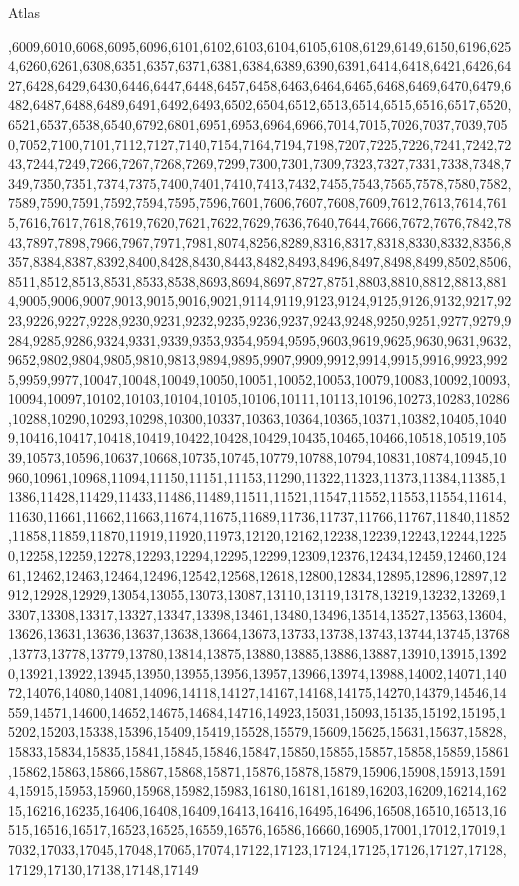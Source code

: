 \begin{lexlean}{Atlas}
\begin{coremodule}
,6009,6010,6068,6095,6096,6101,6102,6103,6104,6105,6108,6129,6149,6150,6196,6254,6260,6261,6308,6351,6357,6371,6381,6384,6389,6390,6391,6414,6418,6421,6426,6427,6428,6429,6430,6446,6447,6448,6457,6458,6463,6464,6465,6468,6469,6470,6479,6482,6487,6488,6489,6491,6492,6493,6502,6504,6512,6513,6514,6515,6516,6517,6520,6521,6537,6538,6540,6792,6801,6951,6953,6964,6966,7014,7015,7026,7037,7039,7050,7052,7100,7101,7112,7127,7140,7154,7164,7194,7198,7207,7225,7226,7241,7242,7243,7244,7249,7266,7267,7268,7269,7299,7300,7301,7309,7323,7327,7331,7338,7348,7349,7350,7351,7374,7375,7400,7401,7410,7413,7432,7455,7543,7565,7578,7580,7582,7589,7590,7591,7592,7594,7595,7596,7601,7606,7607,7608,7609,7612,7613,7614,7615,7616,7617,7618,7619,7620,7621,7622,7629,7636,7640,7644,7666,7672,7676,7842,7843,7897,7898,7966,7967,7971,7981,8074,8256,8289,8316,8317,8318,8330,8332,8356,8357,8384,8387,8392,8400,8428,8430,8443,8482,8493,8496,8497,8498,8499,8502,8506,8511,8512,8513,8531,8533,8538,8693,8694,8697,8727,8751,8803,8810,8812,8813,8814,9005,9006,9007,9013,9015,9016,9021,9114,9119,9123,9124,9125,9126,9132,9217,9223,9226,9227,9228,9230,9231,9232,9235,9236,9237,9243,9248,9250,9251,9277,9279,9284,9285,9286,9324,9331,9339,9353,9354,9594,9595,9603,9619,9625,9630,9631,9632,9652,9802,9804,9805,9810,9813,9894,9895,9907,9909,9912,9914,9915,9916,9923,9925,9959,9977,10047,10048,10049,10050,10051,10052,10053,10079,10083,10092,10093,10094,10097,10102,10103,10104,10105,10106,10111,10113,10196,10273,10283,10286,10288,10290,10293,10298,10300,10337,10363,10364,10365,10371,10382,10405,10409,10416,10417,10418,10419,10422,10428,10429,10435,10465,10466,10518,10519,10539,10573,10596,10637,10668,10735,10745,10779,10788,10794,10831,10874,10945,10960,10961,10968,11094,11150,11151,11153,11290,11322,11323,11373,11384,11385,11386,11428,11429,11433,11486,11489,11511,11521,11547,11552,11553,11554,11614,11630,11661,11662,11663,11674,11675,11689,11736,11737,11766,11767,11840,11852,11858,11859,11870,11919,11920,11973,12120,12162,12238,12239,12243,12244,12250,12258,12259,12278,12293,12294,12295,12299,12309,12376,12434,12459,12460,12461,12462,12463,12464,12496,12542,12568,12618,12800,12834,12895,12896,12897,12912,12928,12929,13054,13055,13073,13087,13110,13119,13178,13219,13232,13269,13307,13308,13317,13327,13347,13398,13461,13480,13496,13514,13527,13563,13604,13626,13631,13636,13637,13638,13664,13673,13733,13738,13743,13744,13745,13768,13773,13778,13779,13780,13814,13875,13880,13885,13886,13887,13910,13915,13920,13921,13922,13945,13950,13955,13956,13957,13966,13974,13988,14002,14071,14072,14076,14080,14081,14096,14118,14127,14167,14168,14175,14270,14379,14546,14559,14571,14600,14652,14675,14684,14716,14923,15031,15093,15135,15192,15195,15202,15203,15338,15396,15409,15419,15528,15579,15609,15625,15631,15637,15828,15833,15834,15835,15841,15845,15846,15847,15850,15855,15857,15858,15859,15861,15862,15863,15866,15867,15868,15871,15876,15878,15879,15906,15908,15913,15914,15915,15953,15960,15968,15982,15983,16180,16181,16189,16203,16209,16214,16215,16216,16235,16406,16408,16409,16413,16416,16495,16496,16508,16510,16513,16515,16516,16517,16523,16525,16559,16576,16586,16660,16905,17001,17012,17019,17032,17033,17045,17048,17065,17074,17122,17123,17124,17125,17126,17127,17128,17129,17130,17138,17148,17149
\end{coremodule}
\end{lexlean}
